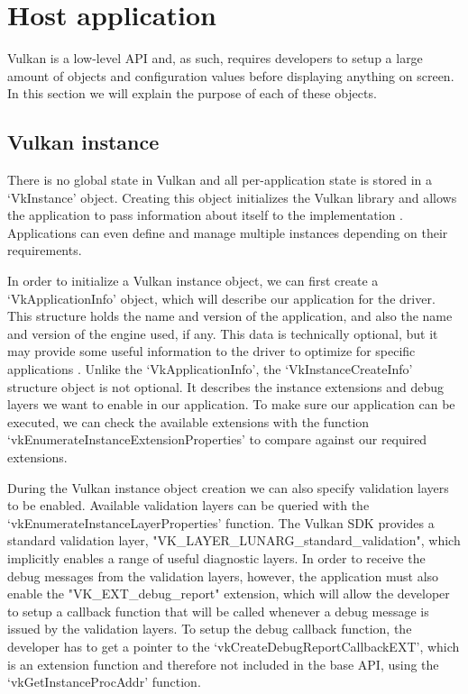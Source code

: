 \section{Host application}
Vulkan is a low-level API and, as such, requires developers to setup a large amount of objects and configuration values before displaying anything on screen. In this section we will explain the purpose of each of these objects.

\subsection{Vulkan instance}
There is no global state in Vulkan and all per-application state is stored in a `VkInstance' object. Creating this object initializes the Vulkan library and allows the application to pass information about itself to the implementation \cite{vulkan_docs}. Applications can even define and manage multiple instances depending on their requirements.

In order to initialize a Vulkan instance object, we can first create a `VkApplicationInfo' object, which will describe our application for the driver. This structure holds the name and version of the application, and also the name and version of the engine used, if any. This data is technically optional, but it may provide some useful information to the driver to optimize for specific applications \cite{vulkan_tutorial}. Unlike the `VkApplicationInfo', the `VkInstanceCreateInfo' structure object is not optional. It describes the instance extensions and debug layers we want to enable in our application. To make sure our application can be executed, we can check the available extensions with the function `vkEnumerateInstanceExtensionProperties' to compare against our required extensions.

During the Vulkan instance object creation we can also specify validation layers to be enabled. Available validation layers can be queried with the `vkEnumerateInstanceLayerProperties' function. The Vulkan SDK provides a standard validation layer, "VK\_LAYER\_LUNARG\_standard\_validation", which implicitly enables a range of useful diagnostic layers. In order to receive the debug messages from the validation layers, however, the application must also enable the "VK\_EXT\_debug\_report" extension, which will allow the developer to setup a callback function that will be called whenever a debug message is issued by the validation layers. To setup the debug callback function, the developer has to get a pointer to the `vkCreateDebugReportCallbackEXT', which is an extension function and therefore not included in the base API, using the `vkGetInstanceProcAddr' function.

